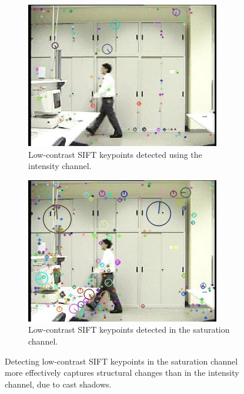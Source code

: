 \begin{figure}
\begin{subfigure}{.49\linewidth}
  \includegraphics[width=1\linewidth]{figures/lab_lowc_rgb_0161.jpg}
  \caption{Low-contrast SIFT keypoints detected using the intensity channel.}
\end{subfigure}
\hfill
\begin{subfigure}{.49\linewidth}
  \includegraphics[width=1\linewidth]{figures/lab_lowc_sat_0161.jpg}
  \caption{Low-contrast SIFT keypoints detected in the saturation channel.}
\end{subfigure}

\caption{Detecting low-contrast SIFT keypoints in the saturation channel more effectively captures structural changes than in the intensity channel, due to cast shadows.}
\label{fig:sat_lowc_kp}
\end{figure}

